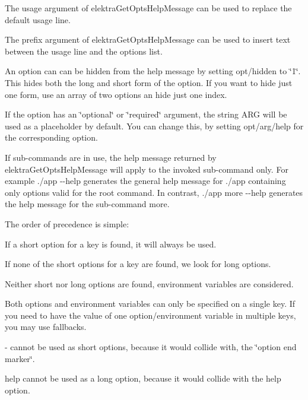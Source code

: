 \begin{DoxyItemize}
\item The {\ttfamily usage} argument of {\ttfamily elektra\+Get\+Opts\+Help\+Message} can be used to replace the default usage line.
\item The {\ttfamily prefix} argument of {\ttfamily elektra\+Get\+Opts\+Help\+Message} can be used to insert text between the usage line and the options list.
\item An option can can be hidden from the help message by setting {\ttfamily opt/hidden} to {\ttfamily \char`\"{}1\char`\"{}}. This hides both the long and short form of the option. If you want to hide just one form, use an array of two options an hide just one index.
\item If the option has an {\ttfamily \char`\"{}optional\char`\"{}} or {\ttfamily \char`\"{}required\char`\"{}} argument, the string {\ttfamily A\+RG} will be used as a placeholder by default. You can change this, by setting {\ttfamily opt/arg/help} for the corresponding option.
\end{DoxyItemize}

If sub-\/commands are in use, the help message returned by {\ttfamily elektra\+Get\+Opts\+Help\+Message} will apply to the invoked sub-\/command only. For example {\ttfamily ./app -\/-\/help} generates the general help message for {\ttfamily ./app} containing only options valid for the root command. In contrast, {\ttfamily ./app more -\/-\/help} generates the help message for the sub-\/command {\ttfamily more}.

The order of precedence is simple\+:


\begin{DoxyItemize}
\item If a short option for a key is found, it will always be used.
\item If none of the short options for a key are found, we look for long options.
\item Neither short nor long options are found, environment variables are considered.
\end{DoxyItemize}


\begin{DoxyItemize}
\item Both options and environment variables can only be specified on a single key. If you need to have the value of one option/environment variable in multiple keys, you may use {\ttfamily fallback}s.
\item {\ttfamily -\/} cannot be used as short options, because it would collide with, the \char`\"{}option end marker\char`\"{}.
\item {\ttfamily help} cannot be used as a long option, because it would collide with the help option.
\end{DoxyItemize}

